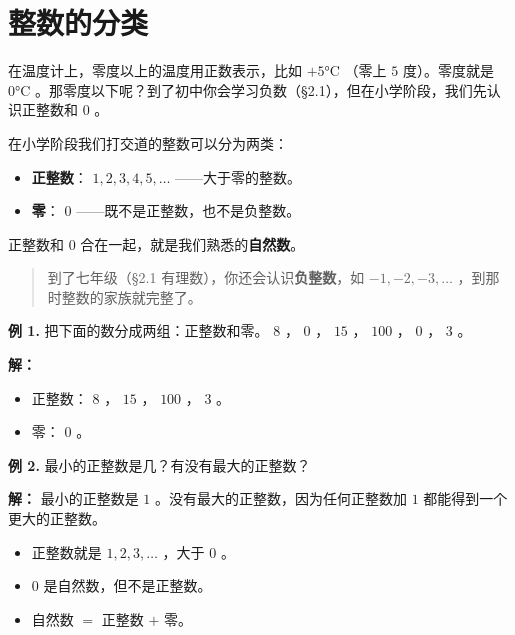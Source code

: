 \section*{整数的分类}


\begin{explore}


在温度计上，零度以上的温度用正数表示，比如 $+5°\text{C}$ （零上 $5$ 度）。零度就是 $0°\text{C}$ 。那零度以下呢？到了初中你会学习负数（§2.1），但在小学阶段，我们先认识正整数和 $0$ 。

\end{explore}

\begin{understand}


在小学阶段我们打交道的整数可以分为两类：

\begin{itemize}
  \item \textbf{正整数}： $1, 2, 3, 4, 5, \ldots$ ——大于零的整数。
  \item \textbf{零}： $0$ ——既不是正整数，也不是负整数。
\end{itemize}


正整数和 $0$ 合在一起，就是我们熟悉的\textbf{自然数}。

\end{understand}

\begin{quote}
到了七年级（§2.1 有理数），你还会认识\textbf{负整数}，如 $-1, -2, -3, \ldots$ ，到那时整数的家族就完整了。
\end{quote}


\begin{workedexamples}


\textbf{例 1.} 把下面的数分成两组：正整数和零。 $8$ ， $0$ ， $15$ ， $100$ ， $0$ ， $3$ 。

\textbf{解：}
\begin{itemize}
  \item 正整数： $8$ ， $15$ ， $100$ ， $3$ 。
  \item 零： $0$ 。
\end{itemize}


\textbf{例 2.} 最小的正整数是几？有没有最大的正整数？

\textbf{解：} 最小的正整数是 $1$ 。没有最大的正整数，因为任何正整数加 $1$ 都能得到一个更大的正整数。

\end{workedexamples}

\begin{keytakeaway}


\begin{itemize}
  \item 正整数就是 $1, 2, 3, \ldots$ ，大于 $0$ 。
  \item $0$ 是自然数，但不是正整数。
  \item 自然数 $=$ 正整数 $+$ 零。
\end{itemize}


\end{keytakeaway}

